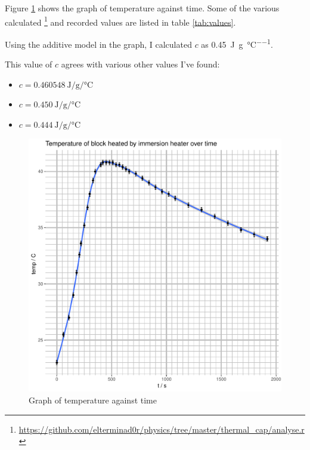 \documentclass[a4paper,11pt]{article}
\begin{document}
Figure \ref{fig:graph} shows the graph of temperature against time. Some of the
various calculated
\footnote{\url{https://github.com/elterminad0r/physics/tree/master/thermal_cap/analyse.r}}
and recorded values are listed in table \ref{tab:values}.

Using the additive model in the graph, I calculated $c$ as
\SI{0.45}{\joule\per\gram\per\celsius}.

This value of $c$ agrees with various other values I've found:

\begin{itemize}
\item $c = \SI{0.460548}{\joule\per\gram\per\celsius}$ \cite{EngineersEdge}
\item $c = \SI{0.450}{\joule\per\gram\per\celsius}$ \cite{DeLeon}
\item $c = \SI{0.444}{\joule\per\gram\per\celsius}$ \cite{Stretton}
\end{itemize}

\begin{figure}[h]
\begin{center}
\includegraphics{Rplots.pdf}
\end{center}
\caption{Graph of temperature against time}\label{fig:graph}
\end{figure}
\end{document}
